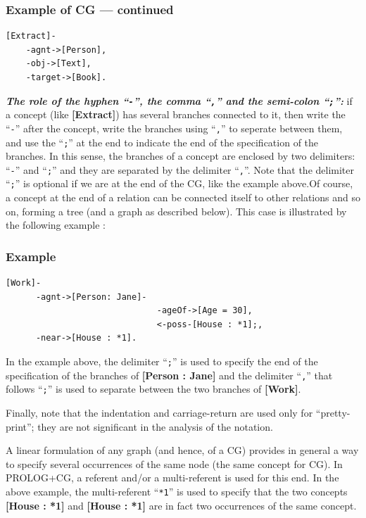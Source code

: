 \documentclass{book}
\begin{document}
\subsubsection{Example of CG --- continued}

\begin{verbatim}
[Extract]-
    -agnt->[Person],
    -obj->[Text],
    -target->[Book].
\end{verbatim}

{\it {\bf The role of the hyphen ``\texttt{-}'', the comma
``\texttt{,}'' and the semi-colon ``\texttt{;}'':}} if a concept (like
{\bf [Extract]}) has several branches connected to it, then write the
``\texttt{-}'' after the concept, write the branches using
``\texttt{,}'' to seperate between them, and use the ``\texttt{;}'' at
the end to indicate the end of the specification of the branches. In
this sense, the branches of a concept are enclosed by two delimiters:
``\texttt{-}'' and ``\texttt{;}'' and they are separated by the
delimiter ``\texttt{,}''. Note that the delimiter ``\texttt{;}'' is
optional if we are at the end of the CG, like the example above.Of
course, a concept at the end of a relation can be connected itself to
other relations and so on, forming a tree (and a graph as described
below). This case is illustrated by the following example :

\subsubsection{Example}


\begin{verbatim}
[Work]-
      -agnt->[Person: Jane]-
                              -ageOf->[Age = 30],
                              <-poss-[House : *1];,
      -near->[House : *1].
\end{verbatim}


In the example above, the delimiter ``\texttt{;}'' is used to specify
the end of the specification of the branches of {\bf [Person : Jane]}
and the delimiter ``\texttt{,}'' that follows ``\texttt{;}'' is used
to separate between the two branches of {\bf [Work]}.

Finally, note that the indentation and carriage-return are used only
for ``pretty-print''; they are not significant in the analysis of the
notation.

A linear formulation of any graph (and hence, of a CG) provides in
general a way to specify several occurrences of the same node (the
same concept for CG). In PROLOG+CG, a referent and/or a multi-referent
is used for this end. In the above example, the multi-referent
``\texttt{*1}'' is used to specify that the two concepts {\bf [House :
*1]} and {\bf [House : *1]} are in fact two occurrences of the same
concept.
\end{document}
